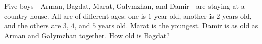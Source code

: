 Five boys---Arman, Bagdat, Marat, Galymzhan, and Damir---are staying at a country house. All are of different ages: one is $1$ year old, another is $2$ years old, and the others are $3$, $4$, and $5$ years old. Marat is the youngest. Damir is as old as Arman and Galymzhan together. How old is Bagdat?
